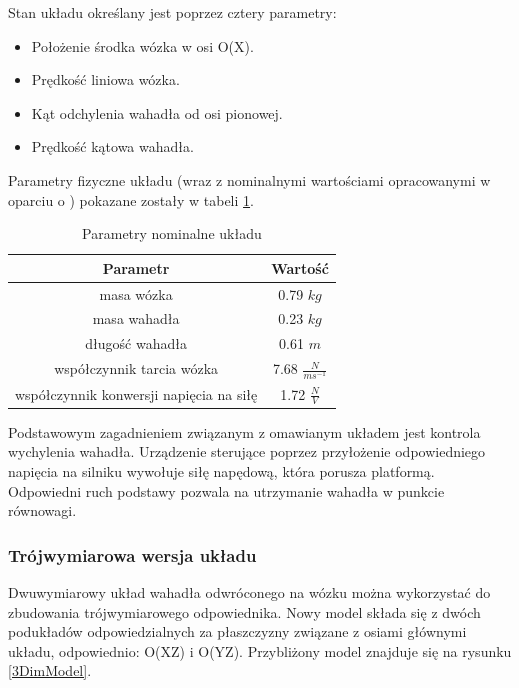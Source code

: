 \documentclass[12pt, twoside, openany]{report}
\theoremstyle{definition}
\begin{document}
Stan układu określany jest poprzez cztery parametry:
\begin{itemize}
\item Położenie środka wózka w osi O(X).
\item Prędkość liniowa wózka.
\item Kąt odchylenia wahadła od osi pionowej.
\item Prędkość kątowa wahadła.
\end{itemize}

Parametry fizyczne układu (wraz z nominalnymi wartościami opracowanymi w oparciu o \cite{LMIP}) pokazane zostały w tabeli \ref{table:NominalParameters}.
\begin{table}[H]
\begin{center}
\begin{tabular}{|c|c|}
  \hline 
  Parametr & Wartość\\
  \hline
  masa wózka & 0.79 \(kg\) \\
  \hline
  masa wahadła & 0.23 \(kg\) \\
  \hline
  długość wahadła & 0.61 \(m\) \\
  \hline
  współczynnik tarcia wózka & 7.68 \(\frac{N}{ms^{-1}}\) \\
  \hline
  współczynnik konwersji napięcia na siłę & 1.72 \(\frac{N}{V}\) \\
  \hline
\end{tabular} 
\end{center}
\caption{Parametry nominalne układu}
\label{table:NominalParameters}
\end{table}

Podstawowym zagadnieniem związanym z omawianym układem jest kontrola wychylenia wahadła. Urządzenie sterujące poprzez przyłożenie odpowiedniego napięcia na silniku wywołuje siłę napędową, która porusza platformą. Odpowiedni ruch podstawy pozwala na utrzymanie wahadła w punkcie równowagi.

\subsubsection{Trójwymiarowa wersja układu}
Dwuwymiarowy układ wahadła odwróconego na wózku można wykorzystać do zbudowania trójwymiarowego odpowiednika. Nowy model składa się z dwóch podukładów odpowiedzialnych za płaszczyzny związane z osiami głównymi układu, odpowiednio: O(XZ) i O(YZ). Przybliżony model znajduje się na rysunku \ref{3DimModel}.
\end{document}
